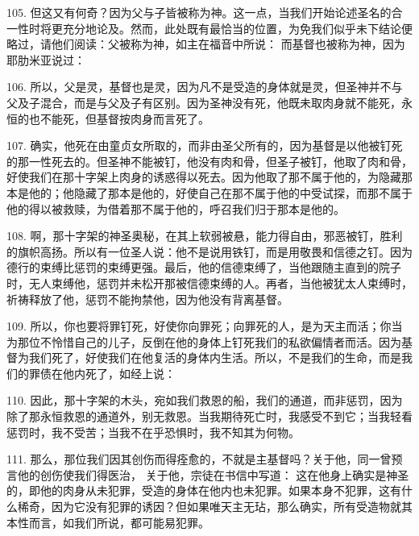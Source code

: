 105. 但这又有何奇？因为父与子皆被称为神。这一点，当我们开始论述圣名的合一性时将更充分地论及。然而，此处既有最恰当的位置，为免我们似乎未下结论便略过，请他们阅读：父被称为神，如主在福音中所说： 而基督也被称为神，因为耶肋米亚说过：\par

106. 所以，父是灵，基督也是灵，因为凡不是受造的身体就是灵，但圣神并不与父及子混合，而是与父及子有区别。因为圣神没有死，他既未取肉身就不能死，永恒的也不能死，但基督按肉身而言死了。\par

107. 确实，他死在由童贞女所取的，而非由圣父所有的，因为基督是以他被钉死的那一性死去的。但圣神不能被钉，他没有肉和骨，但圣子被钉，他取了肉和骨，好使我们在那十字架上肉身的诱惑得以死去。因为他取了那不属于他的，为隐藏那本是他的；他隐藏了那本是他的，好使自己在那不属于他的中受试探，而那不属于他的得以被救赎，为借着那不属于他的，呼召我们归于那本是他的。\par

108. 啊，那十字架的神圣奥秘，在其上软弱被悬，能力得自由，邪恶被钉，胜利的旗帜高扬。所以有一位圣人说：他不是说用铁钉，而是用敬畏和信德之钉。因为德行的束缚比惩罚的束缚更强。最后，他的信德束缚了，当他跟随主直到的院子时，无人束缚他，惩罚并未松开那被信德束缚的人。再者，当他被犹太人束缚时，祈祷释放了他，惩罚不能拘禁他，因为他没有背离基督。\par

109. 所以，你也要将罪钉死，好使你向罪死；向罪死的人，是为天主而活；你当为那位不怜惜自己的儿子，反倒在他的身体上钉死我们的私欲偏情者而活。因为基督为我们死了，好使我们在他复活的身体内生活。所以，不是我们的生命，而是我们的罪债在他内死了，如经上说：\par

110. 因此，那十字架的木头，宛如我们救恩的船，我们的通道，而非惩罚，因为除了那永恒救恩的通道外，别无救恩。当我期待死亡时，我感受不到它；当我轻看惩罚时，我不受苦；当我不在乎恐惧时，我不知其为何物。\par

111. 那么，那位我们因其创伤而得痊愈的，不就是主基督吗？关于他，同一曾预言他的创伤使我们得医治， 关于他，宗徒在书信中写道： 这在他身上确实是神圣的，即他的肉身从未犯罪，受造的身体在他内也未犯罪。如果本身不犯罪，这有什么稀奇，因为它没有犯罪的诱因？但如果唯天主无玷，那么确实，所有受造物就其本性而言，如我们所说，都可能易犯罪。\par

